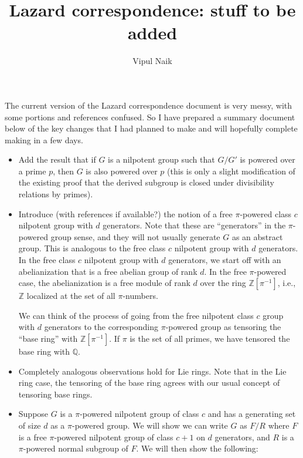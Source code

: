 \documentclass[10pt]{amsart}
\title{Lazard correspondence: stuff to be added}
\author{Vipul Naik}
\begin{document}
\maketitle

The current version of the Lazard correspondence document is very
messy, with some portions and references confused. So I have prepared
a summary document below of the key changes that I had planned to make
and will hopefully complete making in a few days.

\begin{itemize}

\item Add the result that if $G$ is a nilpotent group such that $G/G'$
  is powered over a prime $p$, then $G$ is also powered over $p$ (this
  is only a slight modification of the existing proof that the derived
  subgroup is closed under divisibility relations by primes).

\item Introduce (with references if available?) the notion of a free
  $\pi$-powered class $c$ nilpotent group with $d$ generators. Note
  that these are ``generators'' in the $\pi$-powered group sense, and
  they will not usually generate $G$ as an abstract group. This is
  analogous to the free class $c$ nilpotent group with $d$
  generators. In the free class $c$ nilpotent group with $d$
  generators, we start off with an abelianization that is a free
  abelian group of rank $d$. In the free $\pi$-powered case, the
  abelianization is a free module of rank $d$ over the ring
  $\mathbb{Z}[\pi^{-1}]$, i.e., $\mathbb{Z}$ localized at the set of
  all $\pi$-numbers.

  We can think of the process of going from the free nilpotent class
  $c$ group with $d$ generators to the corresponding $\pi$-powered
  group as tensoring the ``base ring'' with $\mathbb{Z}[\pi^{-1}]$. If
  $\pi$ is the set of all primes, we have tensored the base ring with
  $\mathbb{Q}$.

\item Completely analogous observations hold for Lie rings. Note that
  in the Lie ring case, the tensoring of the base ring agrees with our
  usual concept of tensoring base rings.

\item Suppose $G$ is a $\pi$-powered nilpotent group of class $c$ and
  has a generating set of size $d$ as a $\pi$-powered group. We will
  show we can write $G$ as $F/R$ where $F$ is a free $\pi$-powered
  nilpotent group of class $c + 1$ on $d$ generators, and $R$ is a
  $\pi$-powered normal subgroup of $F$. We will then show the following:


\end{itemize}
\end{document}
